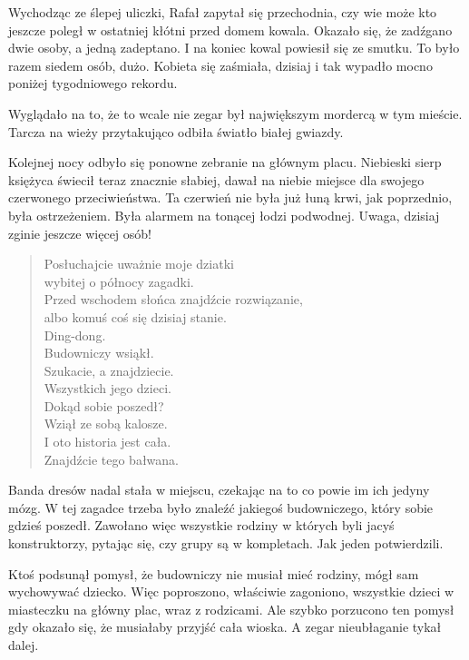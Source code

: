 Wychodząc ze ślepej uliczki, Rafał zapytał się przechodnia, czy wie może kto jeszcze poległ w ostatniej kłótni przed domem kowala. 
Okazało się, że zadźgano dwie osoby, a jedną zadeptano. I na koniec kowal powiesił się ze smutku. To było razem siedem osób, dużo.
Kobieta się zaśmiała, dzisiaj i tak wypadło mocno poniżej tygodniowego rekordu.

Wyglądało na to, że to wcale nie zegar był największym mordercą w tym mieście.
Tarcza na wieży przytakująco odbiła światło białej gwiazdy.

Kolejnej nocy odbyło się ponowne zebranie na głównym placu.
Niebieski sierp księżyca świecił teraz znacznie słabiej, dawał na niebie miejsce dla swojego czerwonego przeciwieństwa.
Ta czerwień nie była już łuną krwi, jak poprzednio, była ostrzeżeniem.
Była alarmem na tonącej łodzi podwodnej.
Uwaga, dzisiaj zginie jeszcze więcej osób!

\begin{sl}
\begin{quote}
Posłuchajcie uważnie moje dziatki \\
wybitej o północy zagadki. \\
Przed wschodem słońca znajdźcie rozwiązanie, \\
albo komuś coś się dzisiaj stanie. \\
Ding-dong. \\
Budowniczy wsiąkł. \\
Szukacie, a znajdziecie. \\
Wszystkich jego dzieci. \\
Dokąd sobie poszedł? \\
Wziął ze sobą kalosze. \\
I oto historia jest cała. \\
Znajdźcie tego bałwana. \\
\end{quote}
\end{sl}

Banda dresów nadal stała w miejscu, czekając na to co powie im ich jedyny mózg.
W tej zagadce trzeba było znaleźć jakiegoś budowniczego, który sobie gdzieś poszedł.
Zawołano więc wszystkie rodziny w których byli jacyś konstruktorzy, pytając się, czy grupy są w kompletach.
Jak jeden potwierdzili.

Ktoś podsunął pomysł, że budowniczy nie musiał mieć rodziny, mógł sam wychowywać dziecko.
Więc poproszono, właściwie zagoniono, wszystkie dzieci w miasteczku na główny plac, wraz z rodzicami.
Ale szybko porzucono ten pomysł gdy okazało się, że musiałaby przyjść cała wioska.
A zegar nieubłaganie tykał dalej.

